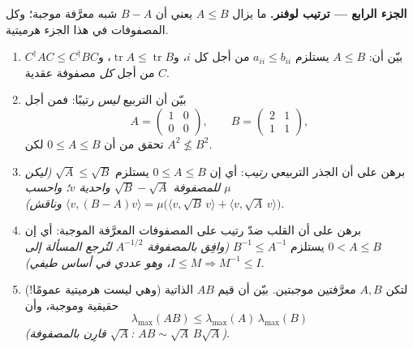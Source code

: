 \begin{problem}
\medskip
\noindent\textbf{الجزء الرابع --- ترتيب لوفنر.} ما يزال $A \leq B$
يعني أن $B - A$ شبه معرَّفة موجبة؛ وكل المصفوفات في هذا
الجزء هرميتية.
\begin{enumerate}[resume]
  \item بيّن أن: $A \leq B$ يستلزم $a_{ii} \leq b_{ii}$ من أجل كل
        $i$، و$\operatorname{tr} A \leq \operatorname{tr} B$،
        و$C^\dagger AC \leq C^\dagger BC$ من أجل \emph{كل}
        مصفوفة عقدية $C$.
  \item بيّن أن التربيع \emph{ليس} رتيبًا: فمن أجل
        \[
        A = \begin{pmatrix} 1 & 0\\ 0 & 0\end{pmatrix},
        \qquad
        B = \begin{pmatrix} 2 & 1\\ 1 & 1\end{pmatrix},
        \]
        تحقق من أن $0 \leq A \leq B$ لكن $A^2 \not\leq B^2$.
  \item برهن على أن الجذر التربيعي \emph{رتيب}: أي إن $0 \leq
        A \leq B$ يستلزم $\sqrt A \leq \sqrt B$ \emph{(ليكن
        $\mu$  للمصفوفة $\sqrt B - \sqrt A$  واحدية
        $v$؛ واحسب $\langle v, (B - A)v\rangle =
        \mu\bigl(\langle v, \sqrt B\,v\rangle + \langle v,
        \sqrt A\,v\rangle\bigr)$ وناقش)}.
  \item برهن على أن القلب ضدّ رتيب على المصفوفات المعرَّفة
        الموجبة: أي إن $0 < A \leq B$ يستلزم $B^{-1} \leq A^{-1}$
        \emph{(وافِق بالمصفوفة $A^{-1/2}$ لتُرجع المسألة إلى $I \leq M
        \Rightarrow M^{-1} \leq I$، وهو عددي في
        أساس طيفي)}.
  \item لتكن $A, B$ معرَّفتين موجبتين. بيّن أن
        قيم $AB$ الذاتية (وهي ليست هرميتية عمومًا!)
        حقيقية وموجبة، وأن
        \[
        \lambda_{\max}(AB) \leq
        \lambda_{\max}(A)\,\lambda_{\max}(B)
        \]
        \emph{(قارِن بالمصفوفة $\sqrt A$: $AB \sim \sqrt
        A\,B\sqrt A$)}.
\end{enumerate}


\end{problem}
